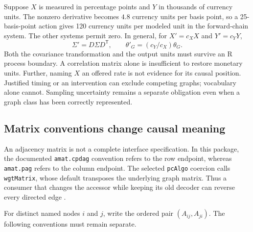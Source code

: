 Suppose \(X\) is measured in percentage points and \(Y\) in thousands of
currency units. The nonzero derivative becomes \(4.8\) currency units
per basis point, so a 25-basis-point action gives 120 currency units per
modeled unit in the forward-chain system. The other systems permit zero.
In general, for \(X'=c_X X\) and \(Y'=c_Y Y\), \[
 \Sigma'=D\Sigma D^{\mathsf T},\qquad
 \theta'_G=(c_Y/c_X)\theta_G.
\] Both the covariance transformation and the output units must survive
an R process boundary. A correlation matrix alone is insufficient to
restore monetary units. Further, naming \(X\) an offered rate is not
evidence for its causal position. Justified timing or an intervention
can exclude competing graphs; vocabulary alone cannot. Sampling
uncertainty remains a separate obligation even when a graph class has
been correctly represented.

\hypertarget{matrix-conventions-change-causal-meaning}{%
\subsection{Matrix conventions change causal
meaning}\label{matrix-conventions-change-causal-meaning}}

An adjacency matrix is not a complete interface specification. In this
package, the documented \texttt{amat.cpdag} convention refers to the row
endpoint, whereas \texttt{amat.pag} refers to the column endpoint. The
selected \texttt{pcAlgo} coercion calls \texttt{wgtMatrix}, whose
default transposes the underlying graph matrix. Thus a consumer that
changes the accessor while keeping its old decoder can reverse every
directed edge \citep{exec13_pcalg,exec13_pcalg_reuse_primary}.

For distinct named nodes \(i\) and \(j\), write the ordered pair
\((A_{ij},A_{ji})\). The following conventions must remain separate.

